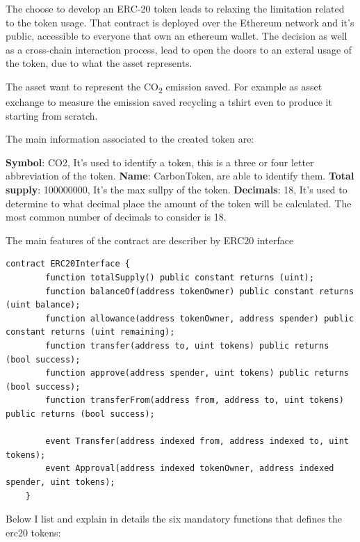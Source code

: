 The choose to develop an ERC-20 token leads to relaxing the limitation related to the token
usage. That contract is deployed over the Ethereum network and it's public, accessible to everyone
that own an ethereum wallet. The decision as well as a cross-chain interaction process, lead to 
open the doors to an exteral usage of the token, due to what the asset represents.
\bigskip

The asset want to represent the CO\textsubscript{2} emission saved. For example as asset exchange to
measure the emission saved recycling a tshirt even to produce it starting from scratch.
\bigskip

The main information associated to the created token are: 

\begin{outline}
    \1 \textbf{Symbol}: CO2, It's used to identify a token, this is a three or four letter abbreviation of the token.
    \1 \textbf{Name}: CarbonToken, are able to identify them.
    \1 \textbf{Total supply}: 100000000, It's the max sullpy of the token.
    \1 \textbf{Decimals}: 18, It's used to determine to what decimal place the amount of the token will be calculated. 
    The most common number of decimals to consider is 18. 
\end{outline}

The main features of the contract are describer by ERC20 interface

\begin{lstlisting}[language=Solidity]
    contract ERC20Interface {
        function totalSupply() public constant returns (uint);
        function balanceOf(address tokenOwner) public constant returns (uint balance);
        function allowance(address tokenOwner, address spender) public constant returns (uint remaining);
        function transfer(address to, uint tokens) public returns (bool success);
        function approve(address spender, uint tokens) public returns (bool success);
        function transferFrom(address from, address to, uint tokens) public returns (bool success);
    
        event Transfer(address indexed from, address indexed to, uint tokens);
        event Approval(address indexed tokenOwner, address indexed spender, uint tokens);
    }
\end{lstlisting}

\bigskip

Below I list and explain in details the six mandatory functions that defines the erc20 tokens:

